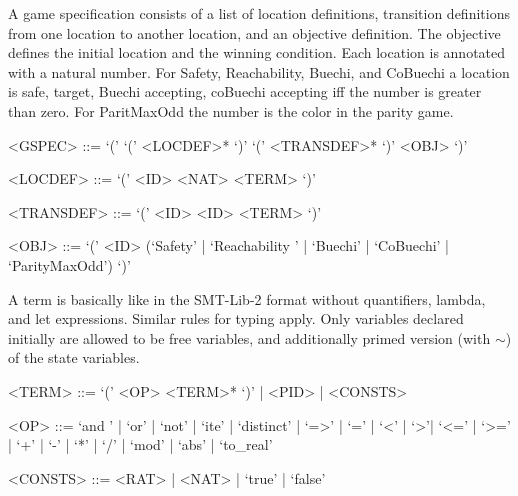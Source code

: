 A game specification consists of a list of location definitions, transition definitions from one location to another location, and an objective definition.
The objective defines the initial location and the winning condition. Each location is annotated with a natural number. For Safety, Reachability, Buechi, and CoBuechi a location is safe, target, Buechi accepting, coBuechi accepting iff the number is greater than zero. 
For ParitMaxOdd the number is the color in the parity game.

\begin{grammar}
<GSPEC>    ::= `(' `(' <LOCDEF>* `)' `(' <TRANSDEF>* `)' <OBJ> `)'

<LOCDEF>   ::= `(' <ID> <NAT> <TERM> `)'

<TRANSDEF> ::= `(' <ID> <ID> <TERM> `)'

<OBJ>      ::= `(' <ID> (`Safety' | `Reachability ' | `Buechi' | `CoBuechi' \newline \phantom{aaaaaaaaaaaaaaaa} | `ParityMaxOdd') `)'
\end{grammar}

A term is basically like in the SMT-Lib-2 format without quantifiers, lambda, and let expressions. Similar rules for typing apply.
Only variables declared initially are allowed to be free variables, and additionally primed version (with $\sim$) of the state variables.

\begin{grammar}
<TERM>   ::= `(' <OP> <TERM>* `)' | <PID> | <CONSTS>

<OP>     ::= `and ' | `or' | `not' | `ite' | `distinct' | `=>' |
         `=' | `<' | `>'| `<=' | `>=' |
         `+' | `-' | `*' | `/' | `mod' | `abs' | `to_real' 

<CONSTS> ::= <RAT> | <NAT> | `true' | `false'
\end{grammar}
